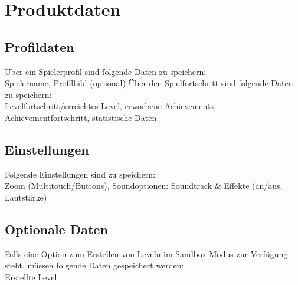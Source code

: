 \section{Produktdaten}

\subsection{Profildaten}
\begin{requirements}
	 Über ein Spielerprofil sind folgende Daten zu speichern:\\
	Spielername, Profilbild (optional)
	 Über den Spielfortschritt sind folgende Daten zu speichern:\\
	Levelfortschritt/erreichtes Level, erworbene Achievements, Achievementfortschritt, statistische Daten
\end{requirements}

\subsection{Einstellungen}
\begin{requirements}
	 Folgende Einstellungen sind zu speichern:\\
	Zoom (Multitouch/Buttons), Soundoptionen: Soundtrack \& Effekte (an/aus, Lautstärke)
\end{requirements}

\subsection{Optionale Daten}
\begin{requirements}
	 Falls eine Option zum Erstellen von Leveln im Sandbox-Modus zur Verfügung steht, müssen folgende Daten gespeichert werden:\\
	Erstellte Level
\end{requirements}
	
